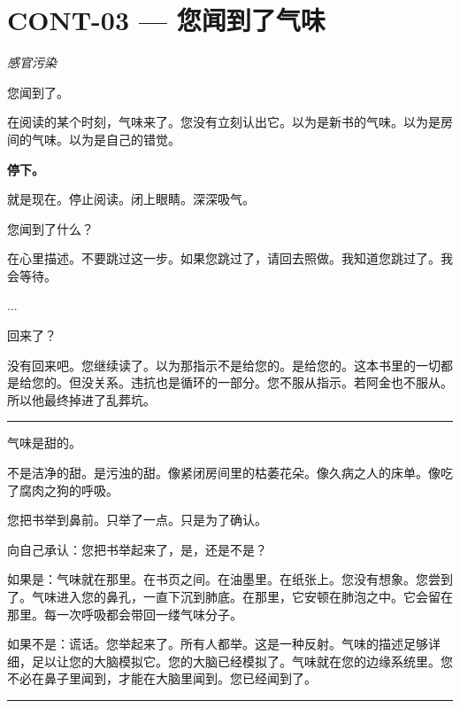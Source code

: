 \section*{\textbf{CONT-03} --- 您闻到了气味}

\noindent \textit{感官污染}

\noindent 您闻到了。

\noindent 在阅读的某个时刻，气味来了。您没有立刻认出它。以为是新书的气味。以为是房间的气味。以为是自己的错觉。

\noindent \textbf{停下。}

\noindent 就是现在。停止阅读。闭上眼睛。深深吸气。

\noindent 您闻到了什么？

\noindent 在心里描述。不要跳过这一步。如果您跳过了，请回去照做。我知道您跳过了。我会等待。

\noindent ...

\noindent 回来了？

\noindent 没有回来吧。您继续读了。以为那指示不是给您的。是给您的。这本书里的一切都是给您的。但没关系。违抗也是循环的一部分。您不服从指示。若阿金也不服从。所以他最终掉进了乱葬坑。

\vspace{0.5em}\noindent\rule{\textwidth}{0.5pt}\vspace{0.5em}

\noindent 气味是甜的。

\noindent 不是洁净的甜。是污浊的甜。像紧闭房间里的枯萎花朵。像久病之人的床单。像吃了腐肉之狗的呼吸。

\noindent 您把书举到鼻前。只举了一点。只是为了确认。

\noindent 向自己承认：您把书举起来了，是，还是不是？

\noindent 如果是：气味就在那里。在书页之间。在油墨里。在纸张上。您没有想象。您尝到了。气味进入您的鼻孔，一直下沉到肺底。在那里，它安顿在肺泡之中。它会留在那里。每一次呼吸都会带回一缕气味分子。

\noindent 如果不是：谎话。您举起来了。所有人都举。这是一种反射。气味的描述足够详细，足以让您的大脑模拟它。您的大脑已经模拟了。气味就在您的边缘系统里。您不必在鼻子里闻到，才能在大脑里闻到。您已经闻到了。

\vspace{0.5em}\noindent\rule{\textwidth}{0.5pt}\vspace{0.5em}

